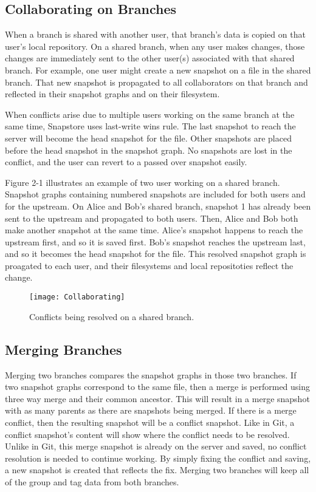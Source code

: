 \subsection{Collaborating on Branches}

When a branch is shared with another user, that branch's data is copied on that user's local repository. On a shared branch, when any user makes changes, those changes are immediately sent to the other user(s) associated with that shared branch. For example, one user might create a new snapshot on a file in the shared branch. That new snapshot is propagated to all collaborators on that branch and reflected in their snapshot graphs and on their filesystem.

When conflicts arise due to multiple users working on the same branch at the same time, Snapstore uses last-write wins rule. The last snapshot to reach the server will become the head snapshot for the file. Other snapshots are placed before the head snapshot in the snapshot graph. No snapshots are lost in the conflict, and the user can revert to a passed over snapshot easily.

Figure 2-1 illustrates an example of two user working on a shared branch. Snapshot graphs containing numbered snapshots are included for both users and for the upstream. On Alice and Bob's shared branch, snapshot 1 has already been sent to the upstream and propagated to both users. Then, Alice and Bob both make another snapshot at the same time. Alice's snapshot happens to reach the upstream first, and so it is saved first. Bob's snapshot reaches the upstream last, and so it becomes the head snapshot for the file. This resolved snapshot graph is proagated to each user, and their filesystems and local repositoties reflect the change.

\begin{figure}
\texttt{[image: Collaborating]}
\caption{Conflicts being resolved on a shared branch.}
\label{arm:fig1}
\end{figure}

\subsection{Merging Branches}

Merging two branches compares the snapshot graphs in those two branches. If two snapshot graphs correspond to the same file, then a merge is performed using three way merge and their common ancestor. This will result in a merge snapshot with as many parents as there are snapshots being merged. If there is a merge conflict, then the resulting snapshot will be a conflict snapshot. Like in Git, a conflict snapshot's content will show where the conflict needs to be resolved. Unlike in Git, this merge snapshot is already on the server and saved, no conflict resolution is needed to continue working. By simply fixing the conflict and saving, a new snapshot is created that reflects the fix. Merging two branches will keep all of the group and tag data from both branches.

